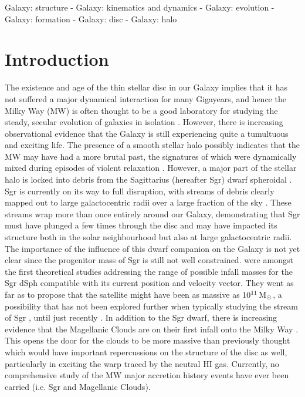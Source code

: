 \documentclass[useAMS,usenatbib]{mnras}
\begin{document}
\begin{keywords}

 Galaxy: structure - Galaxy: kinematics and dynamics - Galaxy: evolution - Galaxy: formation - Galaxy: disc - Galaxy: halo 

\end{keywords}

 
\section{Introduction}

The existence and age of the thin stellar disc in our Galaxy implies that it has not suffered a major dynamical interaction for many Gigayears, and hence the Milky Way (MW) is often thought to be a good laboratory for studying the steady, secular evolution of galaxies in isolation \citep{freeman02}. However, there is increasing observational evidence that the Galaxy is still experiencing quite a tumultuous and exciting life. The presence of a smooth stellar halo \citep{deason11a} possibly indicates that the MW may have had a more brutal past, the signatures of which were dynamically mixed during episodes of violent relaxation \citep{Bullock2005}. However, a major part of the stellar halo is locked into debris from the Sagittarius (hereafter Sgr) dwarf spheroidal \citep{bell08}. Sgr is currently on its way to full disruption, with streams of debris clearly mapped out to large galactocentric radii over a large fraction of the sky  \citep{majewski03,belokurov06, koposov12, sesar17}. These streams wrap more than once entirely around our Galaxy, demonstrating that Sgr must have plunged a few times through the disc and may have impacted its structure both in the solar neighbourhood but also at large galactocentric radii. The importance of the influence of this dwarf companion on  the Galaxy is not yet clear since the progenitor mass of Sgr is still not well constrained. \cite{jiang00} were amongst the first theoretical studies addressing the range of possible infall masses for the Sgr dSph compatible with its current position and velocity vector. They went as far as to propose that the satellite might have been as massive as $10^{11}\,\rm{M_{\odot}}$, a possibility that has not been explored further when typically studying the stream of Sgr \citep{helmi01,helmi04,johnston05,penarrubia10, law10}, until just recently \citep{purcell11,gibbons16}. In addition to the Sgr dwarf, there is increasing evidence that the Magellanic Clouds are on their first infall onto the Milky Way \citep{besla07,kallivayalil13}. This opens the door for the clouds to be more massive than previously thought \citep{boylan-kolchin11, penarrubia16} which would have important repercussions on the structure of the disc \citep{weinberg06,laporte16} as well, particularly in exciting the warp traced by the neutral HI gas. Currently, no comprehensive study of the MW major accretion history events have ever been carried (i.e. Sgr and Magellanic Clouds).
\end{document}
